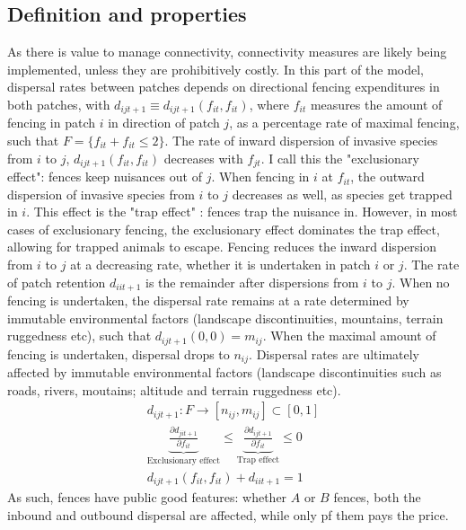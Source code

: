\subsection{Definition and properties}
\label{sec:subsection_fences_definition}
As there is value to manage connectivity, connectivity measures are likely being implemented, unless they are prohibitively costly. In this part of the model, dispersal rates between patches depends on directional fencing expenditures in both patches, with $d_{ijt+1} \equiv d_{ijt+1}(f_{it}, f_{it})$, where $f_{it}$ measures the amount of fencing in patch $i$ in direction of patch $j$, as a percentage rate of maximal fencing, such that $F=\{f_{it} + f_{it} \leq 2\}$.  The rate of inward dispersion of invasive species from $i$ to $j$, $d_{ijt+1}(f_{it},f_{it})$ decreases with $f_{jt}$. I call this the "exclusionary effect": fences keep nuisances out of $j$. When fencing in $i$ at $f_{it}$, the outward dispersion of invasive species from $i$ to $j$ decreases as well, as species get trapped in $i$. This effect is the "trap effect" : fences trap the nuisance in. However, in most cases of exclusionary fencing, the exclusionary effect dominates the trap effect, allowing for trapped animals to escape. Fencing reduces the inward dispersion from $i$ to $j$ at a decreasing rate, whether it is undertaken in patch $i$ or $j$. The rate of patch retention $d_{iit+1}$ is the remainder after dispersions from $i$ to $j$. When no fencing is undertaken, the dispersal rate remains at a rate determined by immutable environmental factors (landscape discontinuities, mountains, terrain ruggedness etc), such that $d_{ijt+1}(0,0) = m_{ij}$. When the maximal amount of fencing is undertaken, dispersal drops to $n_{ij}$. 
Dispersal rates are ultimately affected by immutable environmental factors (landscape discontinuities such as roads, rivers, moutains; altitude and terrain ruggedness etc).
\begin{equation}
\begin{aligned}
d_{ijt+1} : F \to [n_{ij},m_{ij}] \subset [0,1] \\
\underbrace{\frac{\partial d_{jit+1}}{\partial f_{it}}}_{\text{Exclusionary effect}} \leq \underbrace{\frac{\partial d_{ijt+1}}{\partial f_{it}}}_{\text{Trap effect}} \leq 0\\
 d_{ijt+1}(f_{it}, f_{it}) + d_{iit+1} =1
\end{aligned}
\label{eq:dispersal_with_fences}
\end{equation}
As such, fences have public good features: whether $A$ or $B$ fences, both the inbound and outbound dispersal are affected, while only pf them pays the price.

